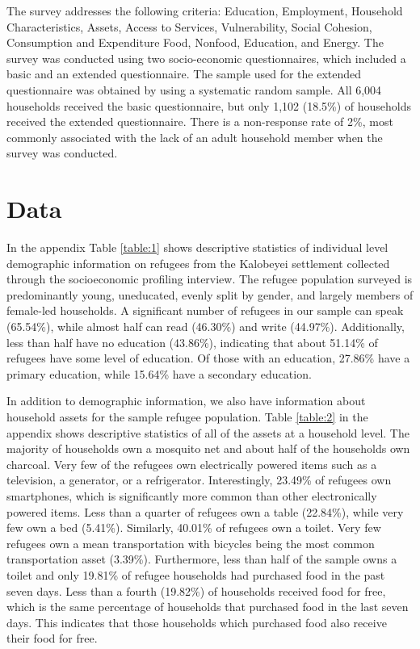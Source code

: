 \documentclass{article}
\begin{document}
The survey addresses the following criteria: Education, Employment, Household Characteristics, Assets, Access to Services, Vulnerability, Social Cohesion, Consumption and Expenditure Food, Nonfood, Education, and Energy. The survey was conducted using two socio-economic questionnaires, which included a basic and an extended questionnaire. The sample used for the extended questionnaire was obtained by using a systematic random sample. All 6,004 households received the basic questionnaire, but only 1,102 (18.5\%) of households received the extended questionnaire. There is a non-response rate of 2\%, most commonly associated with the lack of an adult household member when the survey was conducted.  

\section{Data}
In the appendix Table \ref{table:1} shows descriptive statistics of individual level demographic information on refugees from the Kalobeyei settlement collected through the socioeconomic profiling interview. The refugee population surveyed is predominantly young, uneducated, evenly split by gender, and largely members of female-led households. A significant number of refugees in our sample can speak (65.54\%), while almost half can read (46.30\%) and write (44.97\%). Additionally, less than half have no education (43.86\%), indicating that about 51.14\% of refugees have some level of education. Of those with an education, 27.86\% have a primary education, while 15.64\% have a secondary education. 


In addition to demographic information, we also have information about household assets for the sample refugee population. Table \ref{table:2} in the appendix shows descriptive statistics of all of the assets at a household level. The majority of households own a mosquito net and about half of the households own charcoal. Very few of the refugees own electrically powered items such as a television, a generator, or a refrigerator. Interestingly, 23.49\% of refugees own smartphones, which is significantly more common than other electronically powered items. Less than a quarter of refugees own a table (22.84\%), while very few own a bed (5.41\%). Similarly, 40.01\% of refugees own a toilet. Very few refugees own a mean transportation with bicycles being the most common transportation asset (3.39\%). Furthermore, less than half of the sample owns a toilet and only 19.81\% of refugee households had purchased food in the past seven days. Less than a fourth (19.82\%) of households received food for free, which is the same percentage of households that purchased food in the last seven days. This indicates that those households which purchased food also receive their food for free.
\end{document}
